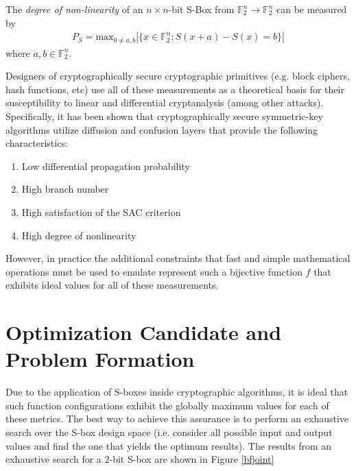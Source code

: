 \documentclass[11pt]{article}
\newcommand{\field}[1]{\mathbb{#1}} %
\begin{document}
\begin{define}
The \emph{degree of non-linearity} of an $n \times n$-bit S-Box from $\field{F}_2^n \to \field{F}_2^n$ can be measured by
\begin{eqnarray*}
	P_S = \text{max}_{0 \not= a, b}|\{x \in \field{F}_2^n : S(x + a) - S(x) = b\}|
\end{eqnarray*}
where $a, b \in \field{F}_2^n$.
\end{define}

Designers of cryptographically secure cryptographic primitives (e.g. block ciphers, hash functions, etc) use all of these measurements as a theoretical basis for their susceptibility to linear and differential cryptanalysis (among other attacks). Specifically, it has been shown that cryptographically secure symmetric-key algorithms utilize diffusion and confusion layers that provide the following characteristics:
\begin{enumerate}
	\item Low differential propagation probability
	\item High branch number
	\item High satisfaction of the SAC criterion
	\item High degree of nonlinearity
\end{enumerate}
However, in practice the additional constraints that fast and simple mathematical operations must be used to emulate represent such a bijective function $f$ that exhibits ideal values for all of these measurements.

\section{Optimization Candidate and Problem Formation}

Due to the application of S-boxes inside cryptographic algorithms, it is ideal that such function configurations exhibit the globally maximum values for each of these metrics. The best way to achieve this assurance is to perform an exhaustive search over the S-box design space (i.e. consider all possible input and output values and find the one that yields the optimum results). The results from an exhaustive search for a $2$-bit S-box are shown in Figure \ref{bfjoint}
\end{document}
